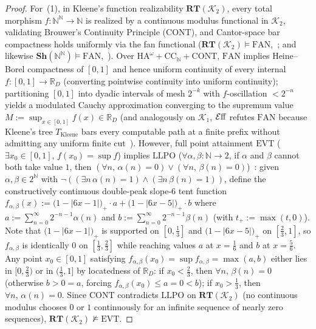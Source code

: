\begin{proof}
For~(1), in Kleene's function realizability $\mathbf{RT}(\mathcal{K}_2)$, every total morphism $f : \mathbb{N}^{\mathbb{N}} \to \mathbb{N}$ is realized by a continuous modulus functional in $\mathcal{K}_2$, validating Brouwer's Continuity Principle ($\mathrm{CONT}$), and Cantor-space bar compactness holds uniformly via the fan functional ($\mathbf{RT}(\mathcal{K}_2) \models \mathrm{FAN}$,~\cite[\S 4.3]{vanOosten08}; and likewise $\mathbf{Sh}(\mathbb{N}^{\mathbb{N}}) \models \mathrm{FAN}$,~\cite[Thm.~3.2]{FourmanHyland79}). Over $\mathrm{HA}^\omega + \mathrm{CC}_{\mathbb{N}} + \mathrm{CONT}$, $\mathrm{FAN}$ implies Heine--Borel compactness of $[0,1]$ and hence uniform continuity of every internal $f : [0,1] \to \mathbb{R}_D$ (converting pointwise continuity into uniform continuity); partitioning $[0,1]$ into dyadic intervals of mesh $2^{-k}$ with $f$-oscillation $< 2^{-n}$ yields a modulated Cauchy approximation converging to the supremum value $M := \sup_{x \in [0,1]} f(x) \in \mathbb{R}_D$ (and analogously on $\mathcal{K}_1$, $\mathcal{E}\mathrm{ff}$ refutes $\mathrm{FAN}$ because Kleene's tree $T_{\mathrm{Kleene}}$ bars every computable path at a finite prefix without admitting any uniform finite cut~\cite[\S 3.2]{vanOosten08}). However, full point attainment $\mathrm{EVT}$ ($\exists x_0 \in [0,1],\, f(x_0) = \sup f$) implies $\mathrm{LLPO}$ ($\forall \alpha, \beta : \mathbb{N} \to 2$, if $\alpha$ and $\beta$ cannot both take value $1$, then $(\forall n,\, \alpha(n) = 0) \lor (\forall n,\, \beta(n) = 0)$)~\cite[Ch.~2]{BridgesRichman87}: given $\alpha, \beta \in 2^{\mathbb{N}}$ with $\neg((\exists n\, \alpha(n) = 1) \wedge (\exists n\, \beta(n) = 1))$, define the constructively continuous double-peak slope-6 tent function $f_{\alpha,\beta}(x) := \bigl(1 - |6x - 1|\bigr)_+ \cdot a + \bigl(1 - |6x - 5|\bigr)_+ \cdot b$ where $a := \sum_{n=0}^{\infty} 2^{-n-1} \alpha(n)$ and $b := \sum_{n=0}^{\infty} 2^{-n-1} \beta(n)$ (with $t_+ := \max(t,0)$). Note that $\bigl(1 - |6x - 1|\bigr)_+$ is supported on $[0, \tfrac{1}{3}]$ and $\bigl(1 - |6x - 5|\bigr)_+$ on $[\tfrac{2}{3}, 1]$, so $f_{\alpha,\beta}$ is identically $0$ on $[\tfrac{1}{3}, \tfrac{2}{3}]$ while reaching values $a$ at $x = \tfrac{1}{6}$ and $b$ at $x = \tfrac{5}{6}$. Any point $x_0 \in [0,1]$ satisfying $f_{\alpha,\beta}(x_0) = \sup f_{\alpha,\beta} = \max(a, b)$ either lies in $[0, \tfrac{2}{3})$ or in $(\tfrac{1}{3}, 1]$ by locatedness of $\mathbb{R}_D$: if $x_0 < \tfrac{2}{3}$, then $\forall n,\, \beta(n) = 0$ (otherwise $b > 0 = a$, forcing $f_{\alpha,\beta}(x_0) \le a = 0 < b$); if $x_0 > \tfrac{1}{3}$, then $\forall n,\, \alpha(n) = 0$. Since $\mathrm{CONT}$ contradicts $\mathrm{LLPO}$ on $\mathbf{RT}(\mathcal{K}_2)$ (no continuous modulus chooses $0$ or $1$ continuously for an infinite sequence of nearly zero sequences), $\mathbf{RT}(\mathcal{K}_2) \not\models \mathrm{EVT}$.


\end{proof}
